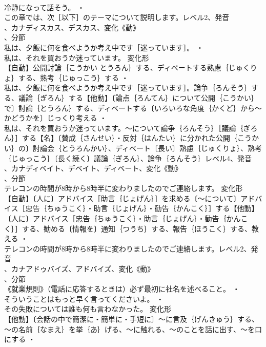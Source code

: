 \documentclass[8pt]{extreport}
\begin{document}
\begin{CJK}{UTF8}{min}
\\	冷静になって話そう。 ・
\\	この章では、次［以下］のテーマについて説明します。レベル2、発音
\\	、カナディスカス、デスカス、変化《動》
\\	、分節
\\	私は、夕飯に何を食べようか考え中です［迷っています］。 ・
\\	私は、それを買おうか迷っています。	変化形 
\\	【自動】公開討論｛こうかい とうろん｝する、ディベートする熟慮｛じゅくりょ｝する、熟考｛じゅっこう｝する ・
\\	私は、夕飯に何を食べようか考え中です［迷っています］。論争｛ろんそう｝する、議論｛ぎろん｝する【他動】〔論点｛ろんてん｝について公開｛こうかい｝で〕討論｛とうろん｝する、ディベートする〔いろいろな角度｛かくど｝から～かどうかを〕じっくり考える ・
\\	私は、それを買おうか迷っています。～について論争｛ろんそう｝［議論｛ぎろん｝］する【名】〔賛成｛さんせい｝・反対｛はんたい｝に分かれた公開｛こうかい｝の〕討論会｛とうろんかい｝、ディベート〔長い〕熟慮｛じゅくりょ｝、熟考｛じゅっこう｝〔長く続く〕議論｛ぎろん｝、論争｛ろんそう｝レベル4、発音
\\	、カナディベイト、デベイト、ディベート、変化《動》
\\	、分節
\\	テレコンの時間が8時から8時半に変わりましたのでご連絡します。	変化形 
\\	【自動】〔人に〕アドバイス［助言｛じょげん｝］を求める〔～について〕アドバイス［忠告｛ちゅうこく｝・助言｛じょげん｝・勧告｛かんこく｝］する【他動】〔人に〕アドバイス［忠告｛ちゅうこく｝・助言｛じょげん｝・勧告｛かんこく｝］する、勧める〔情報を〕通知｛つうち｝する、報告｛ほうこく｝する、教える ・
\\	テレコンの時間が8時から8時半に変わりましたのでご連絡します。レベル2、発音
\\	、カナアドゥバイズ、アドバイズ、変化《動》
\\	、分節
\\	《就業規則》（電話に応答するときは）必ず最初に社名を述べること。 ・
\\	そういうことはもっと早く言ってくださいよ。 ・
\\	その失敗については誰も何も言わなかった。	変化形 
\\	【他動】〔会話の中で簡潔に・簡単に・手短に〕～に言及｛げんきゅう｝する、～の名前｛なまえ｝を挙｛あ｝げる、～に触れる、～のことを話に出す、～を口にする ・

\end{CJK}
\end{document}
